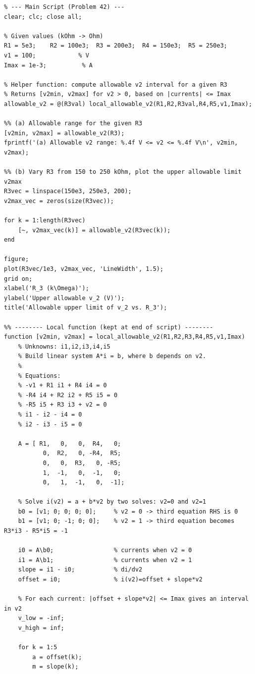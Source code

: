 \documentclass[DIN, pagenumber=false, fontsize=11pt, parskip=half]{scrartcl}
\begin{document}
\begin{lstlisting}
% --- Main Script (Problem 42) ---
clear; clc; close all;

% Given values (kOhm -> Ohm)
R1 = 5e3;    R2 = 100e3;  R3 = 200e3;  R4 = 150e3;  R5 = 250e3;
v1 = 100;            % V
Imax = 1e-3;          % A

% Helper function: compute allowable v2 interval for a given R3
% Returns [v2min, v2max] for v2 > 0, based on |currents| <= Imax
allowable_v2 = @(R3val) local_allowable_v2(R1,R2,R3val,R4,R5,v1,Imax);

%% (a) Allowable range for the given R3
[v2min, v2max] = allowable_v2(R3);
fprintf('(a) Allowable v2 range: %.4f V <= v2 <= %.4f V\n', v2min, v2max);

%% (b) Vary R3 from 150 to 250 kOhm, plot the upper allowable limit v2max
R3vec = linspace(150e3, 250e3, 200);
v2max_vec = zeros(size(R3vec));

for k = 1:length(R3vec)
    [~, v2max_vec(k)] = allowable_v2(R3vec(k));
end

figure;
plot(R3vec/1e3, v2max_vec, 'LineWidth', 1.5);
grid on;
xlabel('R_3 (k\Omega)');
ylabel('Upper allowable v_2 (V)');
title('Allowable upper limit of v_2 vs. R_3');

%% -------- Local function (kept at end of script) --------
function [v2min, v2max] = local_allowable_v2(R1,R2,R3,R4,R5,v1,Imax)
    % Unknowns: i1,i2,i3,i4,i5
    % Build linear system A*i = b, where b depends on v2.
    %
    % Equations:
    % -v1 + R1 i1 + R4 i4 = 0
    % -R4 i4 + R2 i2 + R5 i5 = 0
    % -R5 i5 + R3 i3 + v2 = 0
    % i1 - i2 - i4 = 0
    % i2 - i3 - i5 = 0

    A = [ R1,   0,   0,  R4,   0;
           0,  R2,   0, -R4,  R5;
           0,   0,  R3,   0, -R5;
           1,  -1,   0,  -1,   0;
           0,   1,  -1,   0,  -1];

    % Solve i(v2) = a + b*v2 by two solves: v2=0 and v2=1
    b0 = [v1; 0; 0; 0; 0];     % v2 = 0 -> third equation RHS is 0
    b1 = [v1; 0; -1; 0; 0];    % v2 = 1 -> third equation becomes R3*i3 - R5*i5 = -1

    i0 = A\b0;                 % currents when v2 = 0
    i1 = A\b1;                 % currents when v2 = 1
    slope = i1 - i0;           % di/dv2
    offset = i0;               % i(v2)=offset + slope*v2

    % For each current: |offset + slope*v2| <= Imax gives an interval in v2
    v_low = -inf;
    v_high = inf;

    for k = 1:5
        a = offset(k);
        m = slope(k);


\end{lstlisting}
\end{document}
